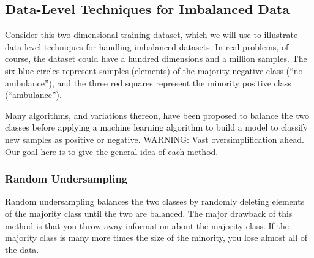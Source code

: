 \subsection{Data-Level Techniques for Imbalanced Data}

Consider this two-dimensional training dataset, which we will use to illustrate data-level techniques for handling imbalanced datasets.  In real problems, of course, the dataset could have a hundred dimensions and a million samples.  The six blue circles represent samples (elements) of the majority negative class (``no ambulance''), and the three red squares represent the minority positive class (``ambulance'').  


\begin{center}
\end{center}

Many algorithms, and variations thereon, have been proposed to balance the two classes before applying a machine learning algorithm to build a model to classify new samples as positive or negative.  WARNING:  Vast oversimplification ahead.  Our goal here is to give the general idea of each method.  



\subsubsection{Random Undersampling}

Random undersampling balances the two classes by randomly deleting elements of the majority class until the two are balanced.  The major drawback of this method is that you throw away information about the majority class.  If the majority class is many more times the size of the minority, you lose almost all of the data.  


